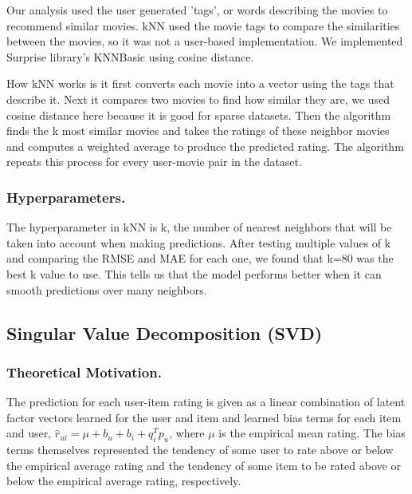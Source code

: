 Our analysis used the user generated 'tags', or words describing the movies to recommend similar movies. kNN used the movie tags to compare the similarities between the movies, so it was not a user-based implementation. We implemented Surprise library's KNNBasic using cosine distance. 

How kNN works is it first converts each movie into a vector using the tags that describe it. Next it compares two movies to find how similar they are, we used cosine distance here because it is good for sparse datasets. Then the algorithm finds the k most similar movies and takes the ratings of these neighbor movies and computes a weighted average to produce the predicted rating. The algorithm repeats this process for every user-movie pair in the dataset. 

\subsubsection{Hyperparameters.}

The hyperparameter in kNN is k, the number of nearest neighbors that will be taken into account when making predictions. After testing multiple values of k and comparing the RMSE and MAE for each one, we found that k=80 was the best k value to use. This tells us that the model performs better when it can smooth predictions over many neighbors. 

\subsection{Singular Value Decomposition (SVD)}

\subsubsection{Theoretical Motivation.}

The prediction for each user-item rating is given as a linear combination of latent factor vectors learned for the user and item and learned bias terms for each item and user,
$ \hat{r}_{ui} = \mu + b_u + b_i + q_i^T p_u $, where $ \mu $ is the empirical mean rating. The bias terms themselves represented the tendency of some user to rate
above or below the empirical average rating and the tendency of some item to be rated above or below the empirical average 
rating, respectively.

